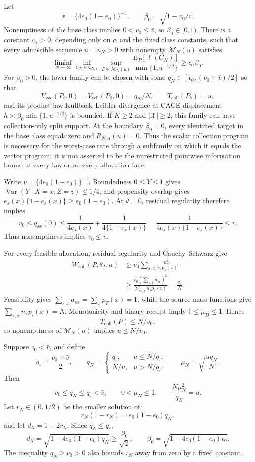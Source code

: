 Let
\[
\bar v=\{4e_0(1-e_0)\}^{-1},
\qquad
\beta_0=\sqrt{1-v_0/\bar v}.
\]
Nonemptiness of the base class implies \(0<v_0\le\bar v\), so \(\beta_0\in[0,1)\). There is a constant \(c_\alpha>0\), depending only on \(\alpha\) and the fixed class constants, such that every admissible sequence \(u=u_N>0\) with nonempty \(\mathcal M_N(u)\) satisfies
\[
\liminf_{N\to\infty}
\inf_{C_N\in\mathfrak C_{N,\alpha}}
\sup_{P\in\mathcal M_N(u)}
\frac{E_P[\ell(C_N)]}{\min\{1,u^{-1/2}\}}
\ge c_\alpha\beta_0.
\]
For \(\beta_0>0\), the lower family can be chosen with some \(q_N\in[v_0,(v_0+\bar v)/2]\) so that
\[
V_{\mathrm{vec}}(P_0,0)=V_{\mathrm{coll}}(P_0,0)=q_N/N,
\qquad T_{\mathrm{coll}}(P_0)=u,
\]
and its product-law Kullback--Leibler divergence at CACE displacement \(h\asymp\beta_0\min\{1,u^{-1/2}\}\) is bounded. If \(K\ge2\) and \(|\mathcal X|\ge2\), this family can have collection-only split support. At the boundary \(\beta_0=0\), every identified target in the base class equals zero and \(R_{N,\alpha}(u)=0\). Thus the scalar collection program is necessary for the worst-case rate through a subfamily on which it equals the vector program; it is not asserted to be the unrestricted pointwise information bound at every law or on every allocation face.

Write \(\bar v=\{4e_0(1-e_0)\}^{-1}\). Boundedness \(0\le Y\le1\) gives \(\operatorname{Var}(Y\mid X=x,Z=z)\le1/4\), and propensity overlap gives \(e_s(x)\{1-e_s(x)\}\ge e_0(1-e_0)\). At \(\theta=0\), residual regularity therefore implies
\[
v_0\le q_{sx}(0)
\le\frac1{4e_s(x)}+\frac1{4\{1-e_s(x)\}}
=\frac1{4e_s(x)\{1-e_s(x)\}}
\le\bar v.
\]
Thus nonemptiness implies \(v_0\le\bar v\).

For every feasible allocation, residual regularity and Cauchy--Schwarz give
\[
\begin{aligned}
W_{\mathrm{coll}}(P,\theta_T,a)
&\ge v_0\sum_{s,x}\frac{a_{sx}^2}{n_sp_s(x)}\\
&\ge\frac{v_0(\sum_{s,x}a_{sx})^2}{\sum_{s,x}n_sp_s(x)}
=\frac{v_0}{N}.
\end{aligned}
\]
Feasibility gives \(\sum_{s,x}a_{sx}=\sum_xp_T(x)=1\), while the source mass functions give \(\sum_{s,x}n_sp_s(x)=N\). Monotonicity and binary receipt imply \(0\le\mu_D\le1\). Hence
\[
T_{\mathrm{coll}}(P)\le N/v_0,
\]
so nonemptiness of \(\mathcal M_N(u)\) implies \(u\le N/v_0\).

Suppose \(v_0<\bar v\), and define
\[
q_\circ=\frac{v_0+\bar v}{2},\qquad
q_N=\begin{cases}
q_\circ,&u\le N/q_\circ,\\[2pt]
N/u,&u>N/q_\circ,
\end{cases}
\qquad
\mu_N=\sqrt{\frac{uq_N}{N}}.
\]
Then
\[
v_0\le q_N\le q_\circ<\bar v,\qquad
0<\mu_N\le1,\qquad
\frac{N\mu_N^2}{q_N}=u.
\]
Let \(r_N\in(0,1/2)\) be the smaller solution of
\[
r_N(1-r_N)=e_0(1-e_0)q_N,
\]
and let \(d_N=1-2r_N\). Since \(q_N\le q_\circ\),
\[
d_N=\sqrt{1-4e_0(1-e_0)q_N}\ge\frac{\beta_0}{\sqrt2},
\qquad
\beta_0=\sqrt{1-4e_0(1-e_0)v_0}.
\]
The inequality \(q_N\ge v_0>0\) also bounds \(r_N\) away from zero by a fixed constant.

